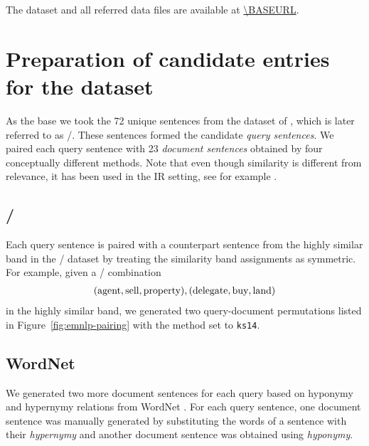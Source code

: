 The dataset and all referred data files are available at \url{\BASEURL}.

\section{Preparation of candidate entries for the dataset}
\label{sec:design}

As the base we took the 72 unique sentences from the dataset of , which is later referred to as \emnlp/.\footnotemark{} These sentences formed the candidate \emph{query sentences}. We paired each query sentence with 23 \emph{document sentences} obtained by four conceptually different methods. Note that even though similarity is different from relevance, it has been used in the IR setting, see for example .
%



\subsection{\emnlp/}

Each query sentence is paired with a counterpart sentence from the highly similar band\footnotemark{} in the \emnlp/ dataset by treating the similarity band assignments as symmetric. For example, given a \emnlp/ combination
%
%
\begin{eqnarray*}
(\textmd{agent}, \textmd{sell}, \textmd{property}),
(\textmd{delegate}, \textmd{buy}, \textmd{land})
\end{eqnarray*}
%
in the highly similar band, we generated two query-document permutations listed in Figure~\ref{fig:emnlp-pairing} with the method set to \texttt{ks14}.

\subsection{WordNet}
We generated two more document sentences for each query based on hyponymy and hypernymy relations from WordNet \cite{Miller:1995:WLD:219717.219748}. For each query sentence, one document sentence was manually generated by substituting the words of a sentence with their \emph{hypernymy} and another document sentence was obtained using \emph{hyponymy}.

